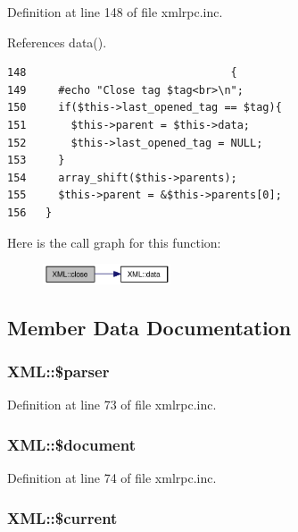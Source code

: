 Definition at line 148 of file xmlrpc.inc.

References data().

\begin{Code}\begin{verbatim}148                                {
149     #echo "Close tag $tag<br>\n";
150     if($this->last_opened_tag == $tag){
151       $this->parent = $this->data;
152       $this->last_opened_tag = NULL;
153     }
154     array_shift($this->parents);
155     $this->parent = &$this->parents[0];
156   }
\end{verbatim}
\end{Code}




Here is the call graph for this function:\nopagebreak
\begin{figure}[H]
\begin{center}
\leavevmode
\includegraphics[width=107pt]{classXML_60144a2134fc1b7f5b4b1b6a7c56bf04_cgraph}
\end{center}
\end{figure}


\subsection{Member Data Documentation}
\hypertarget{classXML_fa14fbca44236b30ab5f3dcfc4b02890}{
\subsubsection{\setlength{\rightskip}{0pt plus 5cm}XML::\$parser}}
\label{classXML_fa14fbca44236b30ab5f3dcfc4b02890}




Definition at line 73 of file xmlrpc.inc.\hypertarget{classXML_01d565098eeda8bf09e4242a2748d570}{
\subsubsection{\setlength{\rightskip}{0pt plus 5cm}XML::\$document}}
\label{classXML_01d565098eeda8bf09e4242a2748d570}




Definition at line 74 of file xmlrpc.inc.\hypertarget{classXML_7c20d75c1719294f3320a537a32753ca}{
\subsubsection{\setlength{\rightskip}{0pt plus 5cm}XML::\$current}}
\label{classXML_7c20d75c1719294f3320a537a32753ca}




